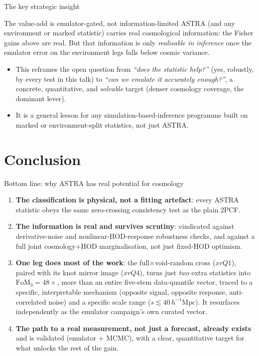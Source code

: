 \documentclass[aspectratio=169,11pt]{beamer}
\newcommand{\Mpch}{\,h^{-1}\mathrm{Mpc}}
\newcommand{\FoM}{\mathrm{FoM}}
\begin{document}
\begin{frame}{The key strategic insight}
\begin{alertblock}{The value-add is emulator-gated, not information-limited}
ASTRA (and any environment or marked statistic) carries real cosmological
information: the Fisher gains above are real. But that information is only
\emph{realisable in inference} once the emulator error on the environment legs
falls below cosmic variance.
\end{alertblock}
\begin{itemize}
\item This reframes the open question from \emph{``does the statistic
  help?''} (yes, robustly, by every test in this talk) to \emph{``can we emulate
  it accurately enough?''}, a concrete, quantitative, and \emph{solvable}
  target (denser cosmology coverage, the dominant lever).
\item It is a general lesson for any simulation-based-inference programme built
  on marked or environment-split statistics, not just ASTRA.
\end{itemize}
\end{frame}

\section{Conclusion}

\begin{frame}{Bottom line: why ASTRA has real potential for cosmology}
\begin{enumerate}
\item \textbf{The classification is physical, not a fitting artefact}: every
  ASTRA statistic obeys the same zero-crossing consistency test as the plain
  2PCF.
\item \textbf{The information is real and survives scrutiny}: vindicated
  against derivative-noise and nonlinear-HOD-response robustness checks, and
  against a full joint cosmology$+$HOD marginalisation, not just fixed-HOD
  optimism.
\item \textbf{One leg does most of the work}: the full$\times$void-random cross
  ($xrQ1$), paired with its knot mirror image ($xrQ4$), turns just \emph{two}
  extra statistics into $\FoM_3=48\times$, more than an entire five-stem
  data-quantile vector, traced to a specific, interpretable mechanism
  (opposite signal, opposite response, anti-correlated noise) and a specific
  scale range ($s\lesssim40\Mpch$). It resurfaces independently as the emulator
  campaign's own curated vector.
\item \textbf{The path to a real measurement, not just a forecast, already
  exists} and is validated (emulator $+$ MCMC), with a clear, quantitative
  target for what unlocks the rest of the gain.
\end{enumerate}
\end{frame}
\end{document}
